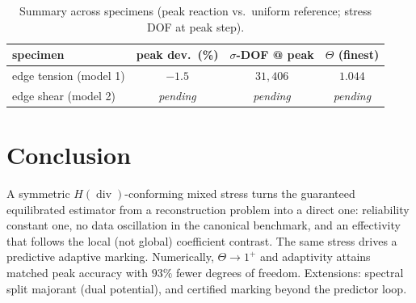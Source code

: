 \documentclass[11pt]{article}
\newcommand{\dv}{\operatorname{div}}
\begin{document}
\begin{table}[t]\centering
\caption{Summary across specimens (peak reaction vs.\ uniform reference;
stress DOF at peak step).}\label{tab:summary}
\begin{tabular}{lccc}
\toprule
specimen & peak dev.\ (\%) & $\sigma$-DOF @ peak & $\Theta$ (finest) \\
\midrule
edge tension (model 1) & $-1.5$ & $31{,}406$ & $1.044$ \\
edge shear (model 2)   & \emph{pending} & \emph{pending} & \emph{pending} \\
\bottomrule
\end{tabular}
\end{table}

\section{Conclusion}
A symmetric $H(\dv)$-conforming mixed stress turns the guaranteed equilibrated
estimator from a reconstruction problem into a direct one: reliability constant
one, no data oscillation in the canonical benchmark, and an effectivity that
follows the local (not global) coefficient contrast. The same stress drives a
predictive adaptive marking. Numerically, $\Theta\to1^+$ and adaptivity attains
matched peak accuracy with $93\%$ fewer degrees of freedom. Extensions: spectral
split majorant (dual potential), and certified marking beyond the predictor
loop.
\end{document}
